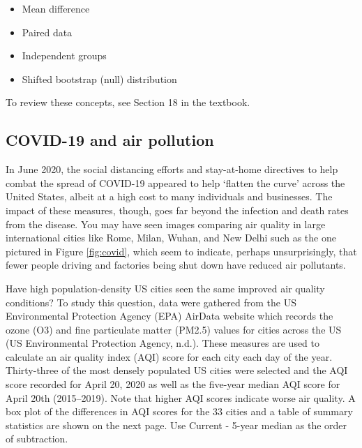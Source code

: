 \documentclass[
]{report}
\begin{document}
\begin{itemize}
\item
  Mean difference
\item
  Paired data
\item
  Independent groups
\item
  Shifted bootstrap (null) distribution
\end{itemize}

To review these concepts, see Section 18 in the textbook.

\hypertarget{covid-19-and-air-pollution}{%
\subsection{COVID-19 and air pollution}\label{covid-19-and-air-pollution}}

In June 2020, the social distancing efforts and stay-at-home directives to help combat the spread of COVID-19 appeared to help `flatten the curve' across the United States, albeit at a high cost to many individuals and businesses. The impact of these measures, though, goes far beyond the infection and death rates from the disease. You may have seen images comparing air quality in large international cities like Rome, Milan, Wuhan, and New Delhi such as the one pictured in Figure \ref{fig:covid}, which seem to indicate, perhaps unsurprisingly, that fewer people driving and factories being shut down have reduced air pollutants.

Have high population-density US cities seen the same improved air quality conditions? To study this question, data were gathered from the US Environmental Protection Agency (EPA) AirData website which records the ozone (O3) and fine particulate matter (PM2.5) values for cities across the US (US Environmental Protection Agency, n.d.). These measures are used to calculate an air quality index (AQI) score for each city each day of the year. Thirty-three of the most densely populated US cities were selected and the AQI score recorded for April 20, 2020 as well as the five-year median AQI score for April 20th (2015--2019). Note that higher AQI scores indicate worse air quality. A box plot of the differences in AQI scores for the 33 cities and a table of summary statistics are shown on the next page. Use Current - 5-year median as the order of subtraction.
\end{document}
